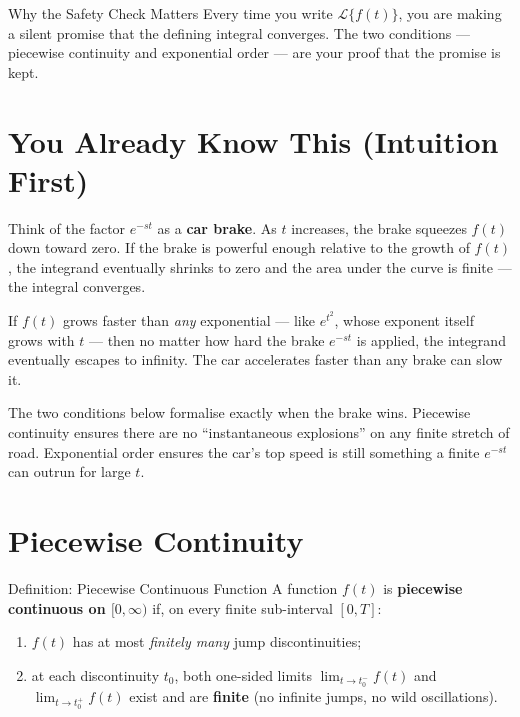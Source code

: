 \documentclass[12pt,a4paper]{article}
\begin{document}
\begin{learnbox}{Why the Safety Check Matters}
Every time you write $\mathcal{L}\{f(t)\}$, you are making a silent promise that the defining
integral converges.
The two conditions --- piecewise continuity and exponential order --- are your proof that the
promise is kept.
\end{learnbox}

\section{You Already Know This (Intuition First)}

Think of the factor $e^{-st}$ as a \textbf{car brake}.
As $t$ increases, the brake squeezes $f(t)$ down toward zero.
If the brake is powerful enough relative to the growth of $f(t)$, the integrand eventually
shrinks to zero and the area under the curve is finite --- the integral converges.

If $f(t)$ grows faster than \emph{any} exponential --- like $e^{t^2}$, whose exponent itself
grows with $t$ --- then no matter how hard the brake $e^{-st}$ is applied, the integrand
eventually escapes to infinity.
The car accelerates faster than any brake can slow it.

The two conditions below formalise exactly when the brake wins.
Piecewise continuity ensures there are no ``instantaneous explosions'' on any finite stretch of
road.
Exponential order ensures the car's top speed is still something a finite $e^{-st}$ can
outrun for large $t$.

\section{Piecewise Continuity}

\begin{infobox}{Definition: Piecewise Continuous Function}
A function $f(t)$ is \textbf{piecewise continuous on $[0, \infty)$} if, on every finite
sub-interval $[0, T]$:
\begin{enumerate}[label=(\roman*)]
  \item $f(t)$ has at most \emph{finitely many} jump discontinuities;
  \item at each discontinuity $t_0$, both one-sided limits
        $\lim_{t \to t_0^-} f(t)$ and $\lim_{t \to t_0^+} f(t)$ exist and are
        \textbf{finite} (no infinite jumps, no wild oscillations).
\end{enumerate}
\end{infobox}
\end{document}
